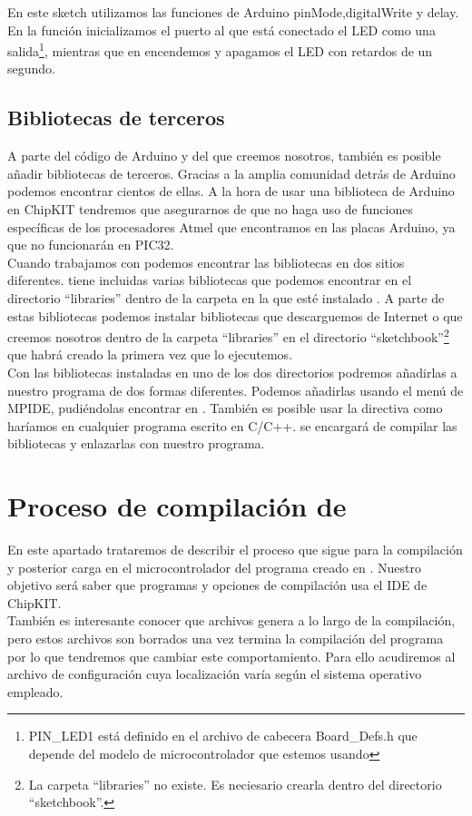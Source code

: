 En este sketch utilizamos las funciones de Arduino pinMode,digitalWrite y delay. En la función  inicializamos el puerto al que está conectado el LED como una salida\footnote{PIN\_LED1 está definido en el archivo de cabecera Board\_Defs.h que depende del modelo de microcontrolador que estemos usando}, mientras que en  encendemos y apagamos el LED con retardos de un segundo.

\subsection{Bibliotecas de terceros}
A parte del código de Arduino y del que creemos nosotros, también es posible añadir bibliotecas de terceros. Gracias a la amplia comunidad detrás de Arduino podemos encontrar cientos de ellas. A la hora de usar una biblioteca de Arduino en ChipKIT tendremos que asegurarnos de que no haga uso de funciones específicas de los procesadores Atmel que encontramos en las placas Arduino, ya que no funcionarán en PIC32.\\
Cuando trabajamos con  podemos encontrar las bibliotecas en dos sitios diferentes.  tiene incluidas varias bibliotecas que podemos encontrar en el directorio ``libraries'' dentro de la carpeta en la que esté instalado . A parte de estas bibliotecas podemos instalar bibliotecas que descarguemos de Internet o que creemos nosotros dentro de la carpeta ``libraries'' en el directorio ``sketchbook''\footnote{La carpeta ``libraries'' no existe. Es neciesario crearla dentro del directorio ``sketchbook''.} que  habrá creado la primera vez que lo ejecutemos.\\
Con las bibliotecas instaladas en uno de los dos directorios podremos añadirlas a nuestro programa de dos formas diferentes. Podemos añadirlas usando el menú de MPIDE, pudiéndolas encontrar en . También es posible usar la directiva  como haríamos en cualquier programa escrito en C/C++.  se encargará de compilar las bibliotecas y enlazarlas con nuestro programa.

\section{Proceso de compilación de }
En este apartado trataremos de describir el proceso que sigue  para la compilación y posterior carga en el microcontrolador del programa creado en . Nuestro objetivo será saber que programas y opciones de compilación usa el IDE de ChipKIT.\\
También es interesante conocer que archivos genera  a lo largo de la compilación, pero estos archivos son borrados una vez termina la compilación del programa por lo que tendremos que cambiar este comportamiento. Para ello acudiremos al archivo de configuración  cuya localización varía según el sistema operativo empleado.

